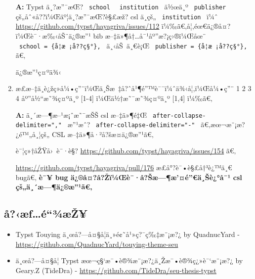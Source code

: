 \begin{enumerate}
  \textbf{A:} Typst ä¸?æ''¯æŒ? \texttt{\ school\ }
  \texttt{\ institution\ } ä½œä¸º \texttt{\ publisher\ }
  çš„åˆ«å??ï¼Œäº¦ä¸?æ''¯æŒ?è§£æž? csl ä¸­çš„ \texttt{\ institution\ } ï¼ˆ
  \url{https://github.com/typst/hayagriva/issues/112}
  ï¼‰ã€‚å¦‚éœ€ä¿®å¤?ï¼Œè¯·æ‰‹åŠ¨ä¿®æ''¹ bib
  æ--‡ä»¶å†\ldots å¯¹åº''æ?¡ç›®ï¼Œåœ¨
  \texttt{\ school\ =\ \{å­¦æ~¡å??ç§°\},\ } ä¸‹åŠ~ä¸€è¡Œ
  \texttt{\ publisher\ =\ \{å­¦æ~¡å??ç§°\},\ } ã€‚

  ä¿®æ''¹ç¤ºä¾‹

\begin{Shaded}
\begin{Highlighting}[]
\NormalTok{\}}
\end{Highlighting}
\end{Shaded}
\item
  æ­£æ--‡ä¸­è¿žç»­å¼•ç''¨ï¼Œä¸Šæ~‡å?ˆå¹¶é''™è¯¯ï¼ˆä¾‹å¦‚ï¼Œå¼•ç''¨ 1 2 3 4
  åº''å½``æ˜¾ç¤ºä¸º {[}1-4{]} ï¼Œä½†æ˜¯æ˜¾ç¤ºä¸º {[}1,4{]} ï¼‰ã€‚

  \textbf{A:} ä¸´æ---¶æ--¹æ¡ˆæ˜¯æŠŠ csl æ--‡ä»¶é‡Œ
  \texttt{\ after-collapse-delimiter=","\ } æ''¹æˆ?
  \texttt{\ after-collapse-delimiter="-"\ } ã€‚æœ¬æ¨¡æ?¿é™„å¸¦çš„ CSL
  æ--‡ä»¶å·²å?šæ­¤ä¿®æ''¹ã€‚

  è¯¦ç»†åŽŸå›~è¯·è§? \url{https://github.com/typst/hayagriva/issues/154}
  ã€‚

  \url{https://github.com/typst/hayagriva/pull/176} æ­£å°?è¯•è§£å†³è¿™ä¸€
  bugã€‚ \textbf{è¯¥ bug ä¿®å¤?å?Žï¼Œè¯·å?Šæ---¶æ'¤é''€ä¸Šè¿°å¯¹ csl
  çš„ä¸´æ---¶ä¿®æ''¹ã€‚}
\end{enumerate}

\subsection{å?‹æƒ\ldots é``¾æŽ¥}\label{uxe5uxe6ux192uxe9uxbeuxe6ux17e}

\begin{itemize}
\tightlist
\item
  Typst Touying ä¸œå?---å¤§å­¦ä¸»é¢˜å¹»ç?¯ç‰‡æ¨¡æ?¿ by QuadnucYard -
  \url{https://github.com/QuadnucYard/touying-theme-seu}
\item
  ä¸œå?---å¤§å­¦ Typst æœ¬ç§`æ¯•è®¾æ¨¡æ?¿ä¸Žæ¯•è®¾ç¿»è¯`æ¨¡æ?¿ by Geary.Z
  (TideDra) - \url{https://github.com/TideDra/seu-thesis-typst}
\end{itemize}

